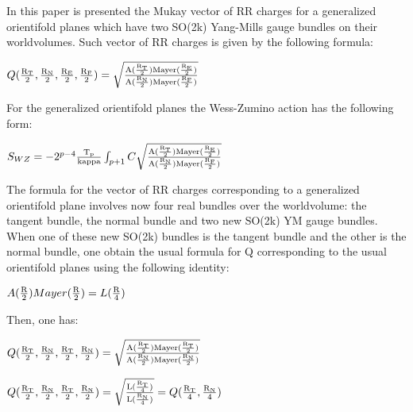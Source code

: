 \documentclass[a4paper,a4paper]{article}
\begin{document}
In this paper is presented the Mukay vector of RR charges for a generalized
orientifold planes which have two SO(2k) Yang-Mills gauge bundles on their worldvolumes.  Such vector of RR charges is given by the following formula:

\begin{center}
{  $ Q(\frac{\rm R_T}{\rm 2},\frac{\rm R_N}{\rm 2},\frac{\rm R_E}{\rm 2},\frac{\rm R_F}{\rm 2}) =\sqrt{\frac{\rm A(\frac{\rm R_T}{\rm 2})Mayer(\frac{\rm R_E}{\rm 2})}{\rm A(\frac{\rm R_N}{\rm 2})Mayer(\frac{\rm R_F}{\rm 2})}} $ }
\end{center}

For the generalized  orientifold planes the Wess-Zumino action has the following form:

\begin{center}
{  $ S_{WZ} = -2^{p-4}\frac{\rm T_p}{\rm kappa}\int_{p+1} C\sqrt{\frac{\rm A(\frac{\rm R_T}{\rm 2})Mayer(\frac{\rm R_E}{\rm 2})}{\rm A(\frac{\rm R_N}{\rm 2})Mayer(\frac{\rm R_F}{\rm 2})}}$ }
\end{center}

The formula for the vector of RR charges corresponding to a generalized orientifold plane involves now four real bundles over the worldvolume: the 
tangent bundle, the normal bundle and two new SO(2k) YM gauge bundles.
When one of these new SO(2k) bundles is the tangent bundle and the other is the normal bundle, one obtain the usual formula for Q corresponding to the usual orientifold planes using the following identity:

\begin{center}
 
{  $A(\frac{\rm R}{\rm 2})Mayer(\frac{\rm R}{\rm 2}) 
 = L(\frac{\rm R}{\rm 4})$}
\end{center} 

Then, one has:

\begin{center}
{  $ Q(\frac{\rm R_T}{\rm 2},\frac{\rm R_N}{\rm 2},\frac{\rm R_T}{\rm 2},\frac{\rm R_N}{\rm 2}) =\sqrt{\frac{\rm A(\frac{\rm R_T}{\rm 2})Mayer(\frac{\rm R_T}{\rm 2})}{\rm A(\frac{\rm R_N}{\rm 2})Mayer(\frac{\rm R_N}{\rm 2})}} $ }
\end{center}

\begin{center}
{  $ Q(\frac{\rm R_T}{\rm 2},\frac{\rm R_N}{\rm 2},\frac{\rm R_T}{\rm 2},\frac{\rm R_N}{\rm 2}) =\sqrt{\frac{\rm L(\frac{\rm R_T}{\rm 4})}{\rm L(\frac{\rm R_N}{\rm 4})}}=Q(\frac{\rm R_T}{\rm 4},\frac{\rm R_N}{\rm 4}) $ }
\end{center}
\end{document}
